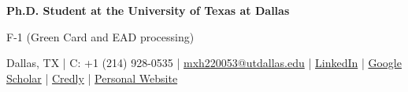 \documentclass[10pt,a4paper,sans]{moderncv}
\begin{document}
\makecvtitle
\vspace*{-10mm}
\begin{center}
\Large \textbf{Ph.D. Student at the University of Texas at Dallas}

\small{F-1 (Green Card and EAD processing)}


\enspace Dallas, TX | C: \enspace +1 (214) 928-0535 | 
\enspace \href{mailto:mxh220053@utdallas.edu}{\color{blue} mxh220053@utdallas.edu} | 
\enspace \href{https://www.linkedin.com/in/mostafa-habibi-78b841284/}{\color{blue} LinkedIn} | 
\enspace \href{https://scholar.google.com/citations?user=dHXIkhMAAAAJ&hl=en}{\color{blue} Google Scholar} | 
\enspace \href{https://www.credly.com/users/mostafa-habibi-dehsheikhi/badges#credly}{\color{blue} Credly} | 
\enspace \href{https://habibi6010.github.io/}{\color{blue} Personal Website}

\end{center}
\vspace*{-7mm}
\end{document}
